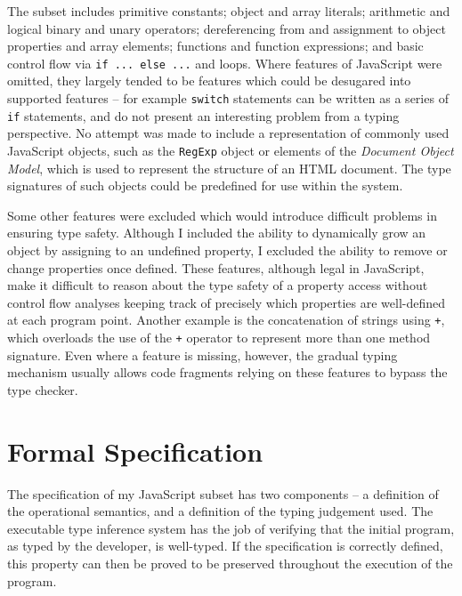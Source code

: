 \documentclass[12pt,a4paper,twoside,openright]{report}
\theoremstyle{definition}
\theoremstyle{dotless}
\newcommand*{\js}{\texttt}
\begin{document}
The subset includes primitive constants; object and array literals;
arithmetic and logical binary and unary operators; dereferencing from and
assignment to object properties and array elements; functions and function expressions; and basic control flow via \js{if ... else ...} and loops.  
Where features of JavaScript were omitted, they largely tended to be features
which could be desugared into supported features -- for example \js{switch}
statements can be written as a series of \js{if} statements, and do not present
an interesting problem from a typing perspective. No attempt was made to
include a representation of commonly used JavaScript objects, such as the
\js{RegExp} object or elements of the \textit{Document Object Model}, which is used to
represent the structure of an HTML document. The type signatures of such objects
could be predefined for use within the system.

Some other features were excluded which would introduce difficult problems in
ensuring type safety.  Although I included the ability to dynamically grow an
object by assigning to an undefined property, I excluded the ability to remove
or change properties once defined. These features, although legal in
JavaScript, make it difficult to reason about the type safety of a property
access without control flow analyses keeping track of precisely which
properties are well-defined at each program point. Another example is the
concatenation of strings using \js{+}, which overloads the use of the \js{+}
operator to represent more than one method signature. Even where a feature is
missing, however, the gradual typing mechanism usually allows code fragments
relying on these features to bypass the type checker.

\section{Formal Specification}

The specification of my JavaScript subset has two components -- a definition of
the operational semantics, and a definition of the typing judgement used. The
executable type inference system has the job of verifying that the initial
program, as typed by the developer, is well-typed. If the specification is
correctly defined, this property can then be proved to be preserved throughout the
execution of the program.
\end{document}

